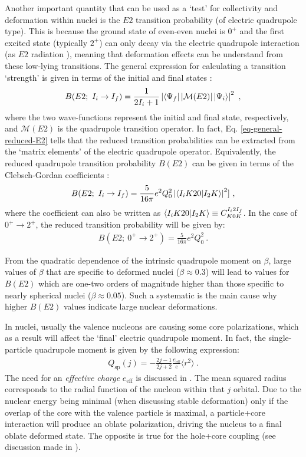 Another important quantity that can be used as a `test' for collectivity and deformation within nuclei is the $E2$ transition probability (of electric quadrupole type). This is because the ground state of even-even nuclei is $0^+$ and the first excited state (typically $2^+$) can only decay via the electric quadrupole interaction (as $E2$ radiation \cite{casten2000nuclear}), meaning that deformation effects can be understand from these low-lying transitions. The general expression for calculating a transition `strength' is given in terms of the initial and final states \cite{matta2017exotic}:
\begin{align}
    B(E2;\ I_i\to I_f)=\frac{1}{2I_i+1}\left|\bra{\Psi_f}\left|\mathcal{M}(E2)\right|\ket{\Psi_i}\right|^2\ ,
    \label{eq-general-reduced-E2}
\end{align}
where the two wave-functions represent the initial and final state, respectively, and $\mathcal{M}(E2)$ is the quadrupole transition operator. In fact, Eq. \ref{eq-general-reduced-E2} tells that the reduced transition probabilities can be extracted from the `matrix elements' of the electric quadrupole operator. Equivalently, the reduced quadrupole transition probability $B(E2)$ can be given in terms of the Clebsch-Gordan coefficients \cite{bohr1998nuclear}:
\begin{align}
    B(E2;\ I_i\to I_f)=\frac{5}{16\pi}e^2Q_0^2\left|\bra{I_iK20}\ket{I_2K}\right|^2]\ ,
\end{align}
where the coefficient can also be written as $\bra{I_iK20}\ket{I_2K}\equiv C^{I_i2I_f}_{K0K}$. In the case of $0^+\to 2^+$, the reduced transition probability will be given by:
\begin{align}
    B(E2;\ 0^+\to 2^+)=\frac{5}{16\pi}e^2Q_0^2\ .
\end{align}

From the quadratic dependence of the intrinsic quadrupole moment on $\beta$, large values of $\beta$ that are specific to deformed nuclei ($\beta\approx 0.3$) will lead to values for $B(E2)$ which are one-two orders of magnitude higher than those specific to nearly spherical nuclei ($\beta\approx 0.05$). Such a systematic is the main cause why higher $B(E2)$ values indicate large nuclear deformations.

In nuclei, usually the valence nucleons are causing some core polarizations, which as a result will affect the `final' electric quadrupole moment. In fact, the single-particle quadrupole moment is given by the following expression:
\begin{align}
    Q_\text{sp}(j)=-\frac{2j-1}{2j+2}\frac{e_\text{eff}}{e}\langle r^2\rangle\ .
    \label{single-particle-quadrupole-moment}
\end{align}
The need for an \emph{effective charge} $e_\text{eff}$ is discussed in \cite{heyde1994nuclear}. The mean squared radius corresponds to the radial function of the nucleon within that $j$ orbital. Due to the nuclear energy being minimal (when discussing stable deformation) only if the overlap of the core with the valence particle is maximal, a particle+core interaction will produce an oblate polarization, driving the nucleus to a final oblate deformed state. The opposite is true for the hole+core coupling (see discussion made in \cite{neugart2006nuclear}).


